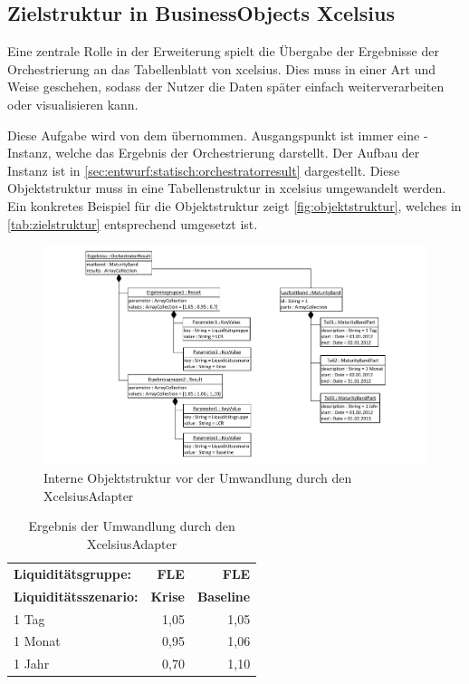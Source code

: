 \begin{onehalfspacing}
\subsection{Zielstruktur in BusinessObjects Xcelsius}
Eine zentrale Rolle in der Erweiterung spielt die Übergabe der Ergebnisse der Orchestrierung an das Tabellenblatt von \gls{xcelsius}. Dies muss in einer Art und Weise geschehen, sodass der Nutzer die Daten später einfach weiterverarbeiten oder visualisieren kann.

Diese Aufgabe wird von dem  übernommen. Ausgangspunkt ist immer eine -Instanz, welche das Ergebnis der Orchestrierung darstellt. Der Aufbau der Instanz ist in \vref{sec:entwurf:statisch:orchestratorresult} dargestellt. Diese Objektstruktur muss in eine Tabellenstruktur in \gls{xcelsius} umgewandelt werden. Ein konkretes Beispiel für die Objektstruktur zeigt \vref{fig:objektstruktur}, welches in \vref{tab:zielstruktur} entsprechend umgesetzt ist.

\begin{figure}[ht]
\centering
\setlength{\unitlength}{1mm}
\includegraphics[width=15cm]{Visio/Entwurf-Objektstruktur.pdf}
\caption{Interne Objektstruktur vor der Umwandlung durch den Xcel\-si\-us\-Adap\-ter \label{fig:objektstruktur}}
\end{figure} 

\begin{table}[ht]
  \centering
  \caption{Ergebnis der Umwandlung durch den XcelsiusAdapter}
    \begin{tabular}{l|r|r}
    \toprule
    \textbf{Liquiditätsgruppe:} & \textbf{FLE} & \textbf{FLE} \\
    \textbf{Liquiditätsszenario:} & \textbf{Krise} & \textbf{Baseline} \\
    \midrule
    1 Tag & 1,05  & 1,05 \\
    1 Monat & 0,95  & 1,06 \\
    1 Jahr & 0,70  & 1,10 \\
    \bottomrule
    \end{tabular}%
  \label{tab:zielstruktur}%
\end{table}%


\end{onehalfspacing}

